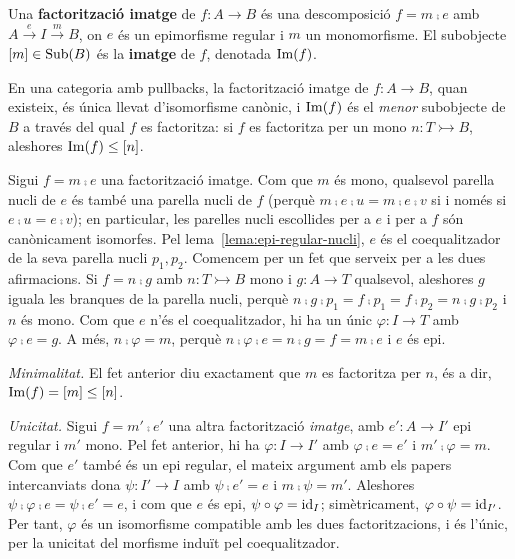 \begin{definicio}
\label{def:imatge}
Una \textbf{factorització imatge} de $f\colon A\to B$ és una descomposició $f=m\comp e$ amb $A\xrightarrow{\,e\,}I\xrightarrow{\,m\,}B$, on $e$ és un epimorfisme regular i $m$ un monomorfisme. El subobjecte $[m]\in\operatorname{Sub}(B)$ és la \textbf{imatge} de $f$, denotada $\operatorname{Im}(f)$.
\end{definicio}

\begin{proposicio}
\label{prop:imatge-unica}
En una categoria amb pullbacks, la factorització imatge de $f\colon A\to B$, quan existeix, és única llevat d'isomorfisme canònic, i $\operatorname{Im}(f)$ és el \emph{menor} subobjecte de $B$ a través del qual $f$ es factoritza: si $f$ es factoritza per un mono $n\colon T\rightarrowtail B$, aleshores $\operatorname{Im}(f)\leq[n]$.
\end{proposicio}

\begin{prova}
Sigui $f=m\comp e$ una factorització imatge. Com que $m$ és mono, qualsevol parella nucli de $e$ és també una parella nucli de $f$ (perquè $m\comp e\comp u=m\comp e\comp v$ si i només si $e\comp u=e\comp v$); en particular, les parelles nucli escollides per a $e$ i per a $f$ són canònicament isomorfes. Pel lema~\ref{lema:epi-regular-nucli}, $e$ és el coequalitzador de la seva parella nucli $p_1,p_2$. Comencem per un fet que serveix per a les dues afirmacions. Si $f=n\comp g$ amb $n\colon T\rightarrowtail B$ mono i $g\colon A\to T$ qualsevol, aleshores $g$ iguala les branques de la parella nucli, perquè $n\comp g\comp p_1=f\comp p_1=f\comp p_2=n\comp g\comp p_2$ i $n$ és mono. Com que $e$ n'és el coequalitzador, hi ha un únic $\varphi\colon I\to T$ amb $\varphi\comp e=g$. A més, $n\comp\varphi=m$, perquè $n\comp\varphi\comp e=n\comp g=f=m\comp e$ i $e$ és epi.

\emph{Minimalitat.} El fet anterior diu exactament que $m$ es factoritza per $n$, és a dir, $\operatorname{Im}(f)=[m]\leq[n]$.

\emph{Unicitat.} Sigui $f=m'\comp e'$ una altra factorització \emph{imatge}, amb $e'\colon A\to I'$ epi regular i $m'$ mono. Pel fet anterior, hi ha $\varphi\colon I\to I'$ amb $\varphi\comp e=e'$ i $m'\comp\varphi=m$. Com que $e'$ també és un epi regular, el mateix argument amb els papers intercanviats dona $\psi\colon I'\to I$ amb $\psi\comp e'=e$ i $m\comp\psi=m'$. Aleshores $\psi\comp\varphi\comp e=\psi\comp e'=e$, i com que $e$ és epi, $\psi\circ\varphi=\operatorname{id}_I$; simètricament, $\varphi\circ\psi=\operatorname{id}_{I'}$. Per tant, $\varphi$ és un isomorfisme compatible amb les dues factoritzacions, i és l'únic, per la unicitat del morfisme induït pel coequalitzador.
\end{prova}

